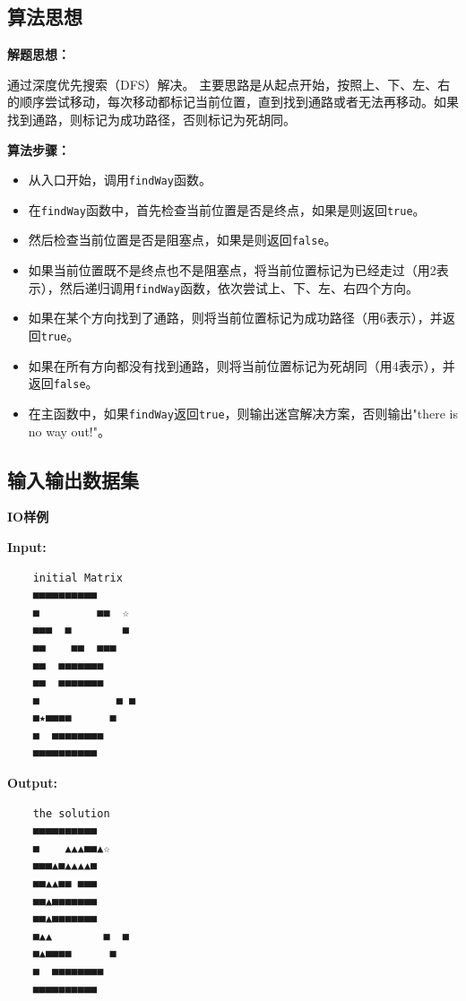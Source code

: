 \documentclass[UTF8]{ctexart}
\begin{document}
\subsection*{算法思想}

\textbf{解题思想：}

通过深度优先搜索（DFS）解决。
主要思路是从起点开始，按照上、下、左、右的顺序尝试移动，每次移动都标记当前位置，直到找到通路或者无法再移动。如果找到通路，则标记为成功路径，否则标记为死胡同。

\textbf{算法步骤：}
\begin{itemize}
    \item 从入口开始，调用\texttt{findWay}函数。
    \item 在\texttt{findWay}函数中，首先检查当前位置是否是终点，如果是则返回\texttt{true}。
    \item 然后检查当前位置是否是阻塞点，如果是则返回\texttt{false}。
    \item 如果当前位置既不是终点也不是阻塞点，将当前位置标记为已经走过（用2表示），然后递归调用\texttt{findWay}函数，依次尝试上、下、左、右四个方向。
    \item 如果在某个方向找到了通路，则将当前位置标记为成功路径（用6表示），并返回\texttt{true}。
    \item 如果在所有方向都没有找到通路，则将当前位置标记为死胡同（用4表示），并返回\texttt{false}。
    \item 在主函数中，如果\texttt{findWay}返回\texttt{true}，则输出迷宫解决方案，否则输出"there is no way out!"。
\end{itemize}


\subsection*{输入输出数据集}

\textbf{IO样例}

\begin{exampleframe}
\textbf{Input:}
\begin{verbatim}
    initial Matrix
    ■■■■■■■■■■
    ■         ■■  ☆
    ■■■  ■        ■
    ■■    ■■  ■■■
    ■■  ■■■■■■■
    ■■  ■■■■■■■
    ■            ■ ■
    ■★■■■■      ■
    ■  ■■■■■■■■
    ■■■■■■■■■■
\end{verbatim}
\textbf{Output:}
\begin{verbatim}
    the solution
    ■■■■■■■■■■
    ■    ▲▲▲■■▲☆
    ■■■▲■▲▲▲▲■
    ■■▲▲■■ ■■■
    ■■▲■■■■■■■
    ■■▲■■■■■■■
    ■▲▲        ■  ■
    ■▲■■■■      ■
    ■  ■■■■■■■■
    ■■■■■■■■■■
\end{verbatim}

\end{exampleframe}
\end{document}
